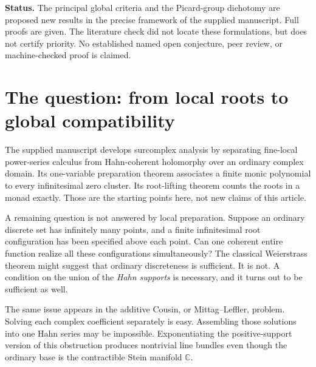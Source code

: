\documentclass[11pt,letterpaper]{article}
\theoremstyle{definition}
\theoremstyle{remark}
\newcommand{\C}{\mathbb C}
\newcommand{\HP}{\mathscr H_{\Gamma,+}}
\numberwithin{equation}{section}
\begin{document}
\begin{titlepage}
\begin{minipage}{0.93\textwidth}
\begin{abstract}
Finally, positive Hahn exponentiation identifies the nonclassical line-bundle obstruction with $H^1(\C,\HP)$. The resulting Picard group vanishes exactly when $\Gamma$ is trivial or cyclic. For every noncyclic value group it contains a complex vector subspace of dimension $2^{\aleph_0}$; for countable noncyclic groups this is its exact dimension. These statements concern the ordinary analytic base and strong Hahn summability, not the fine topology of the full surreal class.
\end{abstract}
\end{minipage}
\vfill
\begin{minipage}{0.93\textwidth}\small
\textbf{Status.} The principal global criteria and the Picard-group dichotomy are proposed new results in the precise framework of the supplied manuscript. Full proofs are given. The literature check did not locate these formulations, but does not certify priority. No established named open conjecture, peer review, or machine-checked proof is claimed.
\end{minipage}
\end{titlepage}
\tableofcontents
\newpage

\section{The question: from local roots to global compatibility}\label{sec:intro}
The supplied manuscript \cite{Source} develops surcomplex analysis by separating fine-local power-series calculus from Hahn-coherent holomorphy over an ordinary complex domain. Its one-variable preparation theorem associates a finite monic polynomial to every infinitesimal zero cluster. Its root-lifting theorem counts the roots in a monad exactly. Those are the starting points here, not new claims of this article.

A remaining question is not answered by local preparation. Suppose an ordinary discrete set has infinitely many points, and a finite infinitesimal root configuration has been specified above each point. Can one coherent entire function realize all these configurations simultaneously? The classical Weierstrass theorem might suggest that ordinary discreteness is sufficient. It is not. A condition on the union of the \emph{Hahn supports} is necessary, and it turns out to be sufficient as well.

The same issue appears in the additive Cousin, or Mittag--Leffler, problem. Solving each complex coefficient separately is easy. Assembling those solutions into one Hahn series may be impossible. Exponentiating the positive-support version of this obstruction produces nontrivial line bundles even though the ordinary base is the contractible Stein manifold $\C$.
\end{document}
